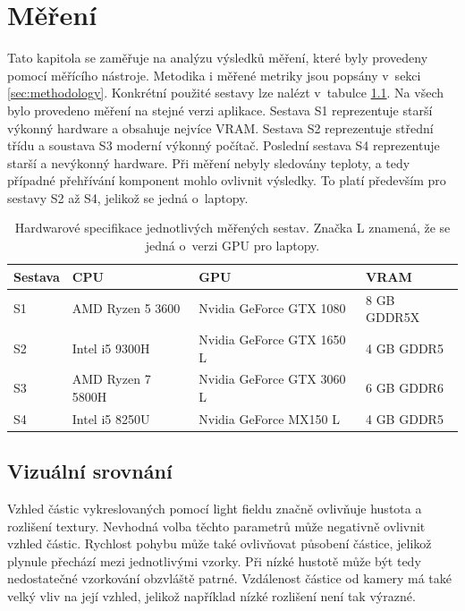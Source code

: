 \chapter{Měření}
Tato kapitola se zaměřuje na analýzu výsledků měření, které byly provedeny pomocí měřícího nástroje. Metodika i měřené metriky jsou popsány v~sekci \ref{sec:methodology}. Konkrétní použité sestavy lze nalézt v~tabulce \ref{tab:pcs}. Na všech bylo provedeno měření na stejné verzi aplikace. Sestava S1 reprezentuje starší výkonný hardware a obsahuje nejvíce VRAM. Sestava S2 reprezentuje střední třídu a soustava S3 moderní výkonný počítač. Poslední sestava S4 reprezentuje starší a nevýkonný hardware. Při měření nebyly sledovány teploty, a tedy případné přehřívání komponent mohlo ovlivnit výsledky. To platí především pro sestavy S2 až S4, jelikož se jedná o~laptopy. 

\begin{center}
\begin{table}[h!]
\centering
\begin{tabular}{|l|l|l|l|}
\hline
\textbf{Sestava} & \textbf{CPU} & \textbf{GPU} & \textbf{VRAM} \\ 
\hline
S1 & AMD Ryzen 5 3600  & Nvidia GeForce GTX 1080 & 8 GB GDDR5X \\ 
S2 & Intel i5 9300H & Nvidia GeForce GTX 1650 L & 4 GB GDDR5  \\ 
S3 & AMD Ryzen 7 5800H  & Nvidia GeForce GTX 3060 L & 6 GB GDDR6 \\ 
S4 & Intel i5 8250U  & Nvidia GeForce MX150 L & 4 GB GDDR5 \\ 
\hline
\end{tabular}
\label{tab:pcs}
 \caption{Hardwarové specifikace jednotlivých měřených sestav. Značka L znamená, že se jedná o~verzi GPU pro laptopy.}
\end{table}
\end{center}

\section{Vizuální srovnání}
Vzhled částic vykreslovaných pomocí light fieldu značně ovlivňuje hustota a rozlišení textury. Nevhodná volba těchto parametrů může negativně ovlivnit vzhled částic. Rychlost pohybu může také ovlivňovat působení částice, jelikož plynule přechází mezi jednotlivými vzorky. Při nízké hustotě může být tedy nedostatečné vzorkování obzvláště patrné. Vzdálenost částice od kamery má také velký vliv na její vzhled, jelikož například nízké rozlišení není tak výrazné. 

